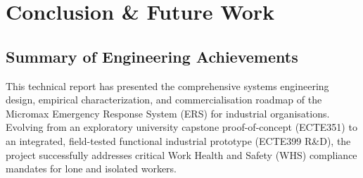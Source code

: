 \chapter{Conclusion \& Future Work}
\label{chap:conclusion}

\section{Summary of Engineering Achievements}
This technical report has presented the comprehensive systems engineering design, empirical characterization, and commercialisation roadmap of the Micromax Emergency Response System (ERS) for industrial organisations. Evolving from an exploratory university capstone proof-of-concept (ECTE351) to an integrated, field-tested functional industrial prototype (ECTE399 R\&D), the project successfully addresses critical Work Health and Safety (WHS) compliance mandates for lone and isolated workers.

